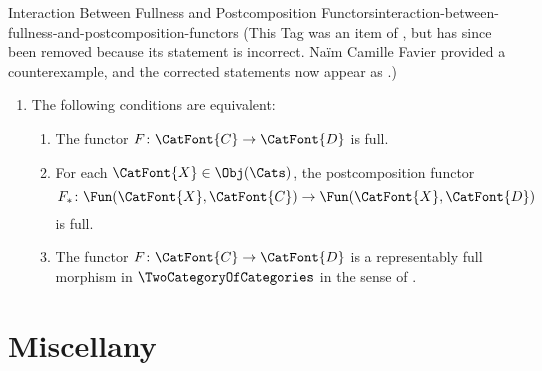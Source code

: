 \begin{oldtag}{Interaction Between Fullness and Postcomposition Functors}{interaction-between-fullness-and-postcomposition-functors}%
    (This Tag was an item of , but has since been removed because its statement is incorrect. Naïm Camille Favier provided a counterexample, and the corrected statements now appear as .)
    \begin{enumerate}
        \item\label{properties-of-full-functors-interaction-with-postcomposition}The following conditions are equivalent:
            \begin{enumerate}
                \item\label{properties-of-full-functors-interaction-with-postcomposition-a}The functor $F\colon\CatFont{C}\to\CatFont{D}$ is full.
                \item\label{properties-of-full-functors-interaction-with-postcomposition-b}For each $\CatFont{X}\in\Obj(\Cats)$, the postcomposition functor
                    \[
                        F_{*}
                        \colon
                        \Fun(\CatFont{X},\CatFont{C})
                        \to
                        \Fun(\CatFont{X},\CatFont{D})
                    \]%
                    is full.
                \item\label{properties-of-full-functors-interaction-with-postcomposition-c}The functor $F\colon\CatFont{C}\to\CatFont{D}$ is a representably full morphism in $\TwoCategoryOfCategories$ in the sense of .
            \end{enumerate}
    \end{enumerate}
\end{oldtag}
\section{Miscellany}\label{section-notes-miscellany}
